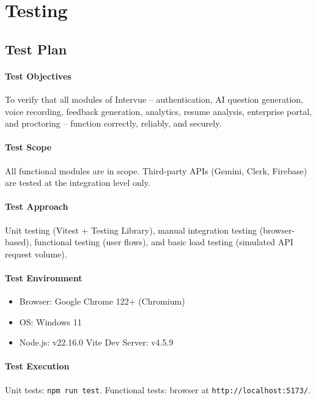 \documentclass{fisatprojectfinal}
\begin{document}
\chapter{Testing}

\section{Test Plan}

\subsubsection*{Test Objectives}
To verify that all modules of Intervue -- authentication, AI question generation, voice
recording, feedback generation, analytics, resume analysis, enterprise portal, and proctoring
-- function correctly, reliably, and securely.

\subsubsection*{Test Scope}
All functional modules are in scope. Third-party APIs (Gemini, Clerk, Firebase) are tested
at the integration level only.

\subsubsection*{Test Approach}
Unit testing (Vitest + Testing Library), manual integration testing (browser-based),
functional testing (user flows), and basic load testing (simulated API request volume).

\subsubsection*{Test Environment}
\begin{itemize}
  \item Browser: Google Chrome 122+ (Chromium)
  \item OS: Windows 11
  \item Node.js: v22.16.0 \quad Vite Dev Server: v4.5.9
\end{itemize}

\subsubsection*{Test Execution}
Unit tests: \texttt{npm run test}. Functional tests: browser at
\texttt{http://localhost:5173/}.
\end{document}
